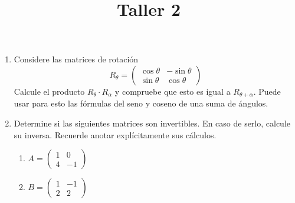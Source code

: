 \documentclass[a4paper]{article}
\title{Taller 2}
\date{}
\begin{document}
\maketitle
\thispagestyle{fancy}

\begin{enumerate}

\item Considere las matrices de rotación $$R_\theta = \begin{pmatrix}
    \cos{\theta} & - \sin{\theta} \\ \sin{\theta} & \cos{\theta}
\end{pmatrix}$$
Calcule el producto $ R_\theta \cdot R_\alpha $ y compruebe que esto es igual a $R_{\theta + \alpha}$. Puede usar para esto las fórmulas del seno y coseno de una suma de ángulos.

\item Determine si las siguientes matrices son invertibles. En caso de serlo, calcule su inversa. Recuerde anotar explícitamente sus cálculos.
\begin{enumerate}
    \item $A= \begin{pmatrix} 1 & 0  \\ 4 & -1  \end{pmatrix} $
    \item $B= \begin{pmatrix} 1 & -1 \\ 2 & 2  \end{pmatrix} $
\end{enumerate}


\end{enumerate}
\end{document}
